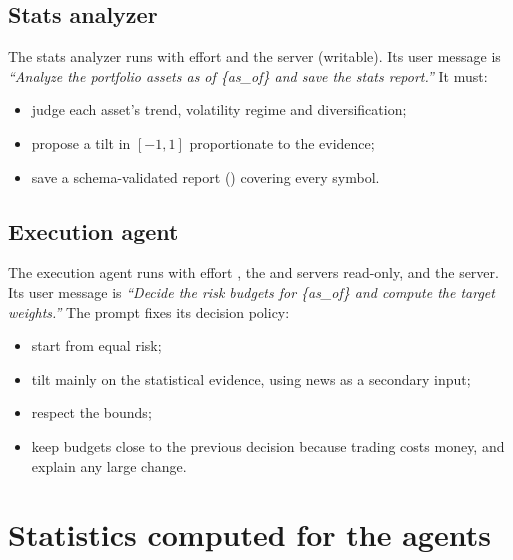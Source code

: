 \documentclass[11pt,a4paper]{article}
\makeatletter
\newcommand{\snippetsource}[1]{\csname snippet@#1\endcsname}
\newcommand{\snippet}[3]{%
  }
\newcommand{\prompt}[2]{%
  }
\makeatother
\begin{document}
\subsection{Stats analyzer}
The stats analyzer runs with effort  and the  server (writable). Its
user message is \emph{``Analyze the portfolio assets as of \{as\_of\} and save the stats
report.''} It must:
\begin{itemize}
  \item judge each asset's trend, volatility regime and diversification;
  \item propose a tilt in $[-1,1]$ proportionate to the evidence;
  \item save a schema-validated report () covering every symbol.
\end{itemize}
\prompt{stats_system}{Stats analyzer system prompt (template)}

\subsection{Execution agent}
The execution agent runs with effort , the  and  servers
read-only, and the  server. Its user message is \emph{``Decide the risk
budgets for \{as\_of\} and compute the target weights.''} The prompt fixes its decision
policy:
\begin{itemize}
  \item start from equal risk;
  \item tilt mainly on the statistical evidence, using news as a secondary input;
  \item respect the bounds;
  \item keep budgets close to the previous decision because trading costs money, and
        explain any large change.
\end{itemize}
\prompt{execution_system}{Execution agent system prompt (template)}
\prompt{backtest_note}{Backtest note, appended for non-live runs (\code{\{mode\_note\}})}
\snippet{team_calls}{Python}{How each agent is called: prompts, user messages, servers, effort}

\section{Statistics computed for the agents}\label{sec:stats}
\end{document}

